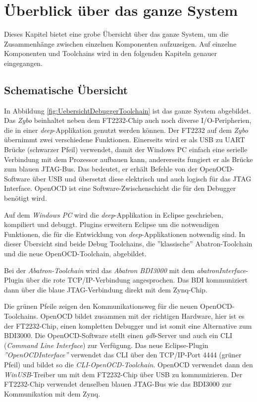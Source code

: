 \chapter{Überblick über das ganze System}
Dieses Kapitel bietet eine grobe Übersicht über das ganze System, um die Zusammenhänge zwischen einzelnen Komponenten aufzuzeigen.
Auf einzelne Komponenten und Toolchains wird in den folgenden Kapiteln genauer eingegangen.


\section{Schematische Übersicht}
In Abbildung \ref{fig:UebersichtDebuggerToolchain} ist das ganze System abgebildet.
Das \textit{Zybo} beinhaltet neben dem FT2232-Chip auch noch diverse I/O-Peripherien, die in einer \textit{deep}-Applikation genutzt werden können.
Der FT2232 auf dem \textit{Zybo} übernimmt zwei verschiedene Funktionen.
Einerseits wird er als USB zu UART Brücke (schwarzer Pfeil) verwendet, damit der Windows PC einfach eine serielle Verbindung mit dem Prozessor aufbauen kann, andererseits fungiert er als Brücke zum blauen JTAG-Bus.
Das bedeutet, er erhält Befehle von der OpenOCD-Software über USB und übersetzt diese elektrisch und auch logisch für das JTAG Interface.
OpenOCD ist eine Software-Zwischenschicht die für den Debugger benötigt wird.

Auf dem \textit{Windows PC} wird die \textit{deep}-Applikation in Eclipse geschrieben, kompiliert und debuggt.
Plugins erweitern Eclipse um die notwendigen Funktionen, die für die Entwicklung von \textit{deep}-Applikationen notwendig sind.
In dieser Übersicht sind beide Debug Toolchains, die ''klassische'' Abatron-Toolchain und die neue OpenOCD-Toolchain, abgebildet.

Bei der \textit{Abatron-Toolchain} wird das \textit{Abatron BDI3000} mit dem \textit{abatronInterface}-Plugin über die rote TCP/IP-Verbindung angesprochen.
Das BDI kommuniziert dann über die blaue JTAG-Verbindung direkt mit dem Zynq-Chip.

Die grünen Pfeile zeigen den Kommunikationsweg für die neuen OpenOCD-Toolchains.
OpenOCD bildet zusammen mit der richtigen Hardware, hier ist es der FT2232-Chip, einen kompletten Debugger und ist somit eine Alternative zum BDI3000.
Die OpenOCD-Software stellt einen \textit{gdb}-Server und auch ein CLI (\textit{Command Line Interface}) zur Verfügung.
Das neue Eclipse-Plugin \textit{''OpenOCDInterface''} verwendet das CLI über den TCP/IP-Port 4444 (grüner Pfeil) und bildet so die \textit{CLI-OpenOCD-Toolchain}.
OpenOCD verwendet dann den \textit{WinUSB}-Treiber um mit dem FT2232-Chip über USB zu kommunizieren.
Der FT2232-Chip verwendet denselben blauen JTAG-Bus wie das BDI3000 zur Kommunikation mit dem Zynq.

